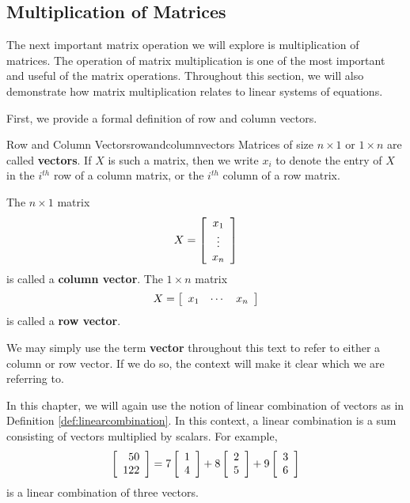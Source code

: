 \subsection{Multiplication of Matrices}

The next important matrix operation we will explore is multiplication
of matrices. The
operation of matrix multiplication is one of the most important and
useful of the matrix operations.  Throughout this section, we will
also demonstrate how matrix multiplication relates to linear systems
of equations.

First, we provide a formal definition of row and column vectors. 

\begin{definition}{Row and Column Vectors}{rowandcolumnvectors}
Matrices of size $n\times 1$ or $1\times n$ are called \textbf{vectors}. If $X$ is such a matrix, then we write $x_{i}$ to 
denote the entry of $X$ in the $i^{th}$ row of a column matrix, or the $i^{th}$ column of a row matrix. 


The $n\times 1$ matrix
\begin{equation*}
X=\left[
\begin{array}{c}
x_{1} \\
\vdots \\
x_{n}
\end{array}
\right]
\end{equation*}
is called
a \textbf{column vector}.
The $1\times n$ matrix
\begin{equation*}
X = \left[
\begin{array}{ccc}
x_{1} & \cdots & x_{n}
\end{array}
\right]
\end{equation*}
is called a \textbf{row vector}.
\end{definition}

We may simply use the term \textbf{vector} throughout this text to refer to either a column or row vector. 
If we do so, the context will make it clear which we are referring to.

In this chapter, we will again use the notion of linear combination of
vectors as in  Definition \ref{def:linearcombination}.  In this context, a linear combination is a sum
consisting of vectors multiplied by scalars.  For example,
\begin{equation*}
\left[
\begin{array}{r}
50 \\
122
\end{array}
\right]
=
7\left[
\begin{array}{r}
1 \\
4
\end{array}
\right] +8\left[
\begin{array}{r}
2 \\
5
\end{array}
\right] +9\left[
\begin{array}{r}
3 \\
6
\end{array}
\right]
\end{equation*}
is a linear combination of three vectors. 

